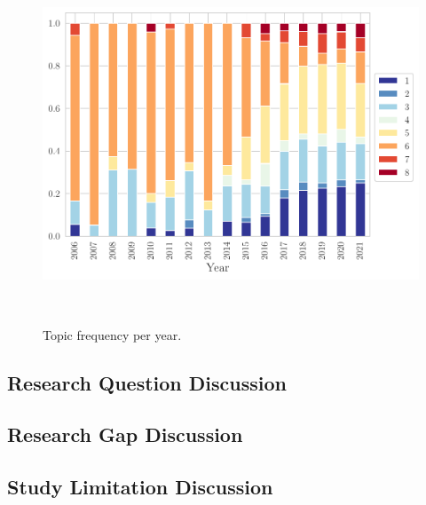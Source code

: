 \documentclass[parskip=full]{scrartcl}
\begin{document}
\begin{figure}[H]
	\centering
    \includegraphics[width=\linewidth]{../analysis/topics_per_year}
    \caption{Topic frequency per year.
    }~\label{fig:topics_per_year}
\end{figure}

% 
% 

\subsection{Research Question Discussion}


\subsection{Research Gap Discussion}

\subsection{Study Limitation Discussion}
\end{document}
